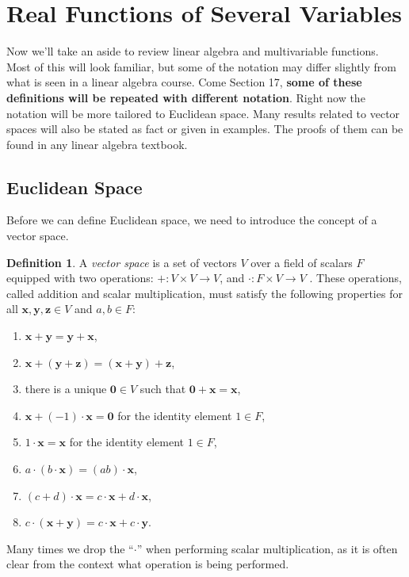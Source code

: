 \documentclass{article}
\newcommand{\x}{\mathbf{x}}
\newcommand{\y}{\mathbf{y}}
\newcommand{\z}{\mathbf{z}}
\newcommand{\ze}{\mathbf{0}}
\theoremstyle{definition}
\newtheorem{definition}{Definition}[section]
\begin{document}
	\section{Real Functions of Several Variables}
	Now we'll take an aside to review linear algebra and multivariable functions. Most of this will look familiar, but some of the notation may differ slightly from what is seen in a linear algebra course. Come Section 17, \textbf{some of these definitions will be repeated with different notation}. Right now the notation will be more tailored to Euclidean space. Many results related to vector spaces will also be stated as fact or given in examples. The proofs of them can be found in any linear algebra textbook. 
	\subsection{Euclidean Space}
	Before we can define Euclidean space, we need to introduce the concept of a vector space. 
	\begin{definition}\label{def8.1}
		A \textit{\color{red}vector space} is a set of vectors $ V $ over a field of scalars $ F $ equipped with two operations: $ +:V\times V\to V $, and $ \cdot:F\times V\to V $ . These operations, called addition and scalar multiplication, must satisfy the following properties for all $ \x,\y,\mathbf{z}\in V $ and $ a,b\in F $:
		\begin{enumerate}
			\item $ \x+\y=\y+\x $,
			\item $ \x+(\y+\z)=(\x+\y)+\z $,
			\item there is a unique $ \mathbf{0}\in V $ such that $ \ze+\x=\x $,
			\item $ \x+(-1)\cdot\x=\ze $ for the identity element $ 1\in F $,
			\item $ 1\cdot\x=\x $ for the identity element $ 1\in F $,
			\item $ a\cdot(b\cdot\x)=(ab)\cdot\x $,
			\item $ (c+d)\cdot\x=c\cdot\x+d\cdot\x $,
			\item $ c\cdot(\x+\y)=c\cdot\x+c\cdot\y $.
		\end{enumerate}
	\end{definition}
	Many times we drop the ``$ \cdot $'' when performing scalar multiplication, as it is often clear from the context what operation is being performed. 
	
\end{document}
